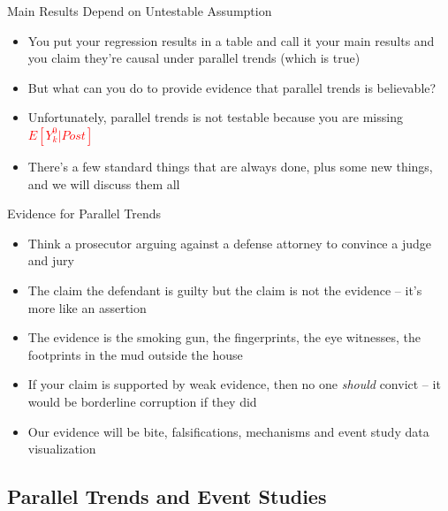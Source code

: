 \documentclass{beamer}
\begin{document}
\begin{frame}{Main Results Depend on Untestable Assumption}

	\begin{itemize}
	\item You put your regression results in a table and call it your main results and you claim they're causal under parallel trends (which is true)
	\item But what can you do to provide evidence that parallel trends is believable?
	\item Unfortunately, parallel trends is not testable because you are missing \textcolor{red}{$E[Y^0_k|Post]$} 
	\item There's a few standard things that are always done, plus some new things, and we will discuss them all
	\end{itemize}

\end{frame}


\begin{frame}{Evidence for Parallel Trends}

	\begin{itemize}

	\item Think a prosecutor arguing against a defense attorney to convince a judge and jury
	\item The claim the defendant is guilty but the claim is not the evidence -- it's more like an assertion
	\item The evidence is the smoking gun, the fingerprints, the eye witnesses, the footprints in the mud outside the house
	\item If your claim is supported by weak evidence, then no one \emph{should} convict -- it would be borderline corruption if they did 
	\item Our evidence will be bite, falsifications, mechanisms and event study data visualization 
	\end{itemize}

\end{frame}








\subsection{Parallel Trends and Event Studies}
\end{document}
